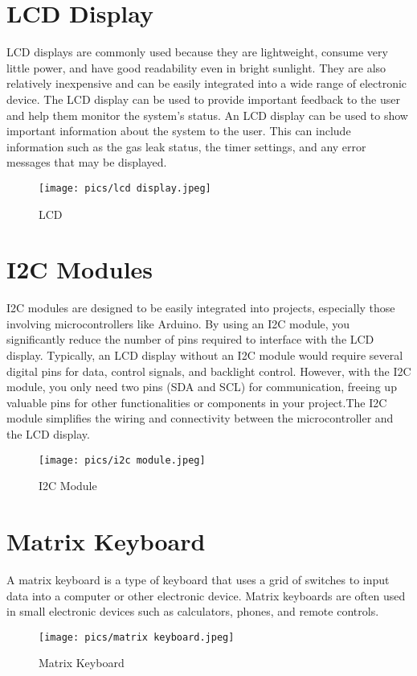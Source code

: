 \documentclass[a4paper,12pt]{report}
\begin{document}
\begin{}
\section{LCD Display}
LCD displays are commonly used because they are lightweight, consume very little power, and
have good readability even in bright sunlight. They are also relatively inexpensive and can be
easily integrated into a wide range of electronic device.
The LCD display can be used to provide important feedback to the user and help them monitor the
system's status.
An LCD display can be used to show important information about the system to the user. This can
include information such as the gas leak status, the timer settings, and any error messages that may
be displayed.
\begin{center}
    \begin{figure}[!hbt]
    \texttt{[image: pics/lcd display.jpeg]}
    \centering
    \caption{LCD}
    \label{fig:}
    \end{figure}
\end{center}

\section{I2C Modules}
I2C modules are designed to be easily integrated into projects, especially those involving
microcontrollers like Arduino.
By using an I2C module, you significantly reduce the number of pins required to interface with the
LCD display. Typically, an LCD display without an I2C module would require several digital pins
for data, control signals, and backlight control. However, with the I2C module, you only need two
pins (SDA and SCL) for communication, freeing up valuable pins for other functionalities or
components in your project.The I2C module simplifies the wiring and connectivity between the microcontroller and the LCD
display.
\begin{center}
    \begin{figure}[!hbt]
    \texttt{[image: pics/i2c module.jpeg]}
    \centering
    \caption{I2C Module}
    \label{fig:}
    \end{figure}
\end{center}
\section{Matrix Keyboard} 
A matrix keyboard is a type of keyboard that uses a grid of switches to input data into a
computer or other electronic device. Matrix keyboards are often used in small electronic devices
such as calculators, phones, and remote controls.
\begin{center}
    \begin{figure}[!hbt]
    \texttt{[image: pics/matrix keyboard.jpeg]}
    \centering
    \caption{Matrix Keyboard}
    \label{fig:}
    \end{figure}
\end{center}


\end{}
\end{document}
